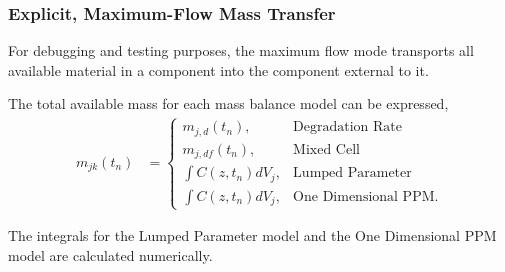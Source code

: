 \subsubsection{Explicit, Maximum-Flow Mass Transfer}\label{sed:max_flow_mass_transfer}

For debugging and testing purposes, the maximum flow mode transports all
available material in a component into the component external to it.

The total available mass for each mass balance model can be expressed,
\begin{align}
m_{jk}(t_n) &= \begin{cases}
                         m_{j,d}(t_n), & \mbox{Degradation Rate}\\
                         m_{j,df}(t_n), & \mbox{Mixed Cell}\\
                         \int C(z,t_n)dV_j, & \mbox{Lumped Parameter}\\
                         \int C(z,t_n)dV_j, & \mbox{One Dimensional PPM}.
               \end{cases}
\end{align}

The integrals for the Lumped Parameter model and the One Dimensional PPM model
are calculated numerically.
